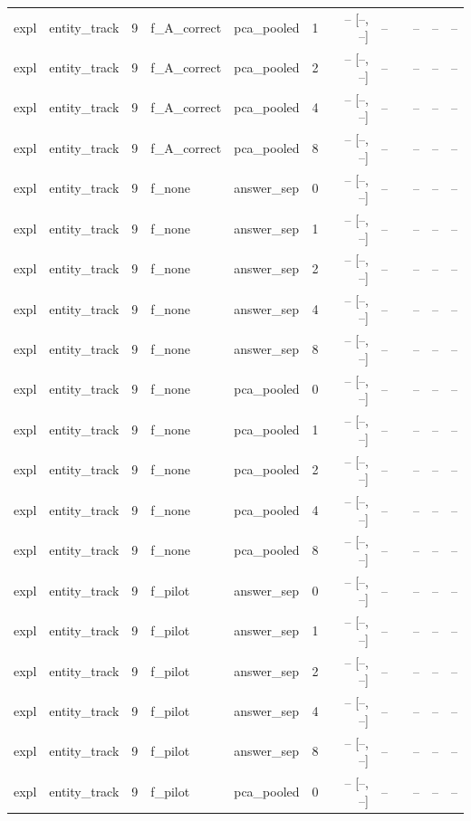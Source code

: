 \begin{tabular}{llrllrrrlrrr}
expl & entity\_track & 9 & f\_A\_correct & pca\_pooled & 1 & -- [--, --] & -- &  & -- & -- & -- \\
expl & entity\_track & 9 & f\_A\_correct & pca\_pooled & 2 & -- [--, --] & -- &  & -- & -- & -- \\
expl & entity\_track & 9 & f\_A\_correct & pca\_pooled & 4 & -- [--, --] & -- &  & -- & -- & -- \\
expl & entity\_track & 9 & f\_A\_correct & pca\_pooled & 8 & -- [--, --] & -- &  & -- & -- & -- \\
expl & entity\_track & 9 & f\_none & answer\_sep & 0 & -- [--, --] & -- &  & -- & -- & -- \\
expl & entity\_track & 9 & f\_none & answer\_sep & 1 & -- [--, --] & -- &  & -- & -- & -- \\
expl & entity\_track & 9 & f\_none & answer\_sep & 2 & -- [--, --] & -- &  & -- & -- & -- \\
expl & entity\_track & 9 & f\_none & answer\_sep & 4 & -- [--, --] & -- &  & -- & -- & -- \\
expl & entity\_track & 9 & f\_none & answer\_sep & 8 & -- [--, --] & -- &  & -- & -- & -- \\
expl & entity\_track & 9 & f\_none & pca\_pooled & 0 & -- [--, --] & -- &  & -- & -- & -- \\
expl & entity\_track & 9 & f\_none & pca\_pooled & 1 & -- [--, --] & -- &  & -- & -- & -- \\
expl & entity\_track & 9 & f\_none & pca\_pooled & 2 & -- [--, --] & -- &  & -- & -- & -- \\
expl & entity\_track & 9 & f\_none & pca\_pooled & 4 & -- [--, --] & -- &  & -- & -- & -- \\
expl & entity\_track & 9 & f\_none & pca\_pooled & 8 & -- [--, --] & -- &  & -- & -- & -- \\
expl & entity\_track & 9 & f\_pilot & answer\_sep & 0 & -- [--, --] & -- &  & -- & -- & -- \\
expl & entity\_track & 9 & f\_pilot & answer\_sep & 1 & -- [--, --] & -- &  & -- & -- & -- \\
expl & entity\_track & 9 & f\_pilot & answer\_sep & 2 & -- [--, --] & -- &  & -- & -- & -- \\
expl & entity\_track & 9 & f\_pilot & answer\_sep & 4 & -- [--, --] & -- &  & -- & -- & -- \\
expl & entity\_track & 9 & f\_pilot & answer\_sep & 8 & -- [--, --] & -- &  & -- & -- & -- \\
expl & entity\_track & 9 & f\_pilot & pca\_pooled & 0 & -- [--, --] & -- &  & -- & -- & -- \\

\end{tabular}
